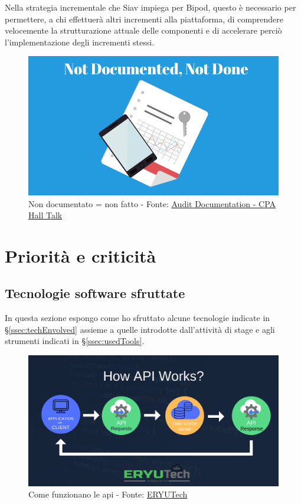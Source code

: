Nella strategia incrementale che Siav impiega per Bipod, questo è necessario per permettere, a chi effettuerà altri incrementi alla piattaforma, di comprendere velocemente la strutturazione attuale delle componenti e di accelerare perciò l'implementazione degli incrementi stessi.
\vspace{45px}
\begin{figure}[H]
    \centering
    \includegraphics[width=0.75\columnwidth]{immagini/Not-documented-not-done.png}
    \caption{Non documentato = non fatto - Fonte: \href{https://cpahalltalk.com/audit-documentation/}{Audit Documentation - CPA Hall Talk}}
    \label{fig:notDone}
\end{figure}
\newpage
\section{Priorità e criticità}
\subsection{Tecnologie software sfruttate}
In questa sezione espongo come ho sfruttato alcune tecnologie indicate in \S\ref{ssec:techEnvolved} assieme a quelle introdotte dall'attività di stage e agli strumenti indicati in \S\ref{ssec:usedTools}.
\vspace{40pt}
\begin{figure}[H]
    \centering
    \includegraphics[width=0.9\columnwidth]{immagini/how_api_works.png}
    \caption{Come funzionano le \acrshort{api} - Fonte: \href{https://www.facebook.com/eryutech/photos/application-programming-interface-apihow-it-works-eryutech/1125855790904330/}{ERYUTech}}
    \label{fig:howApiWorks}
\end{figure}
